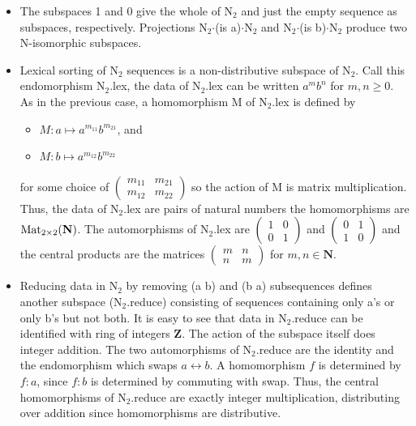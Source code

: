 \documentclass[11pt]{article}
\begin{document}
\begin{itemize}
\item{The subspaces 1 and 0 give the whole of N$_2$ and just the empty sequence as subspaces, respectively.  
Projections N$_2$$\cdot$(is a)$\cdot$N$_2$ and N$_2$$\cdot$(is b)$\cdot$N$_2$ produce two N-isomorphic subspaces.}
\item{Lexical sorting of N$_2$ sequences is a non-distributive subspace of N$_2$.  Call this endomorphism N$_2$.lex, the data of N$_2$.lex 
can be written $a^m b^n$ for $m,n\ge 0$.  As in the previous case, a homomorphism M of N$_2$.lex is defined by  
\begin{itemize}
\item [] $M: a\mapsto a^{m_{11}} b^{m_{21}}$, and 
\item [] $M: b\mapsto a^{m_{12}} b^{m_{22}}$ 
\end{itemize}
for some choice of 
$
\left (
\begin{array}{cc} 
m_{11} & m_{21} \\ m_{12} & m_{22}  
\end{array}
\right ) 
$
so the action of M is matrix multiplication.  Thus, the data of N$_2$.lex are pairs of natural numbers the 
homomorphisms are ${\rm Mat}_{2\times2}(\mathbf N)$.  The automorphisms of N$_2$.lex are 
$
\left (
\begin{array}{cc} 
1 & 0 \\ 0 & 1 
\end{array}
\right ) 
$
and 
$
\left (
\begin{array}{cc} 
0 & 1 \\ 1 & 0 
\end{array}
\right ) 
$
and the central products are the matrices 
$
\left (
\begin{array}{cc} 
m & n \\ n & m 
\end{array}
\right ) 
$
for $m,n\in\mathbf N$.


}
\item{Reducing data in N$_2$ by removing (a b) and (b a) subsequences defines another subspace (N$_2$.reduce) consisting of 
sequences containing only a's or only b's but not both.  It is easy to see that data in N$_2$.reduce can be identified with 
ring of integers $\mathbf Z$.  The action of the subspace itself does integer addition.  
The two automorphisms of N$_2$.reduce are the identity and the endomorphism which 
swaps $a\leftrightarrow b$.  A homomorphism $f$ is determined by $f:a$, since $f:b$ is determined by commuting with swap. 
Thus, the central homomorphisms of N$_2$.reduce are exactly integer multiplication, distributing over addition since homomorphisms are 
distributive.  

} 
\end{itemize}
\end{document}
